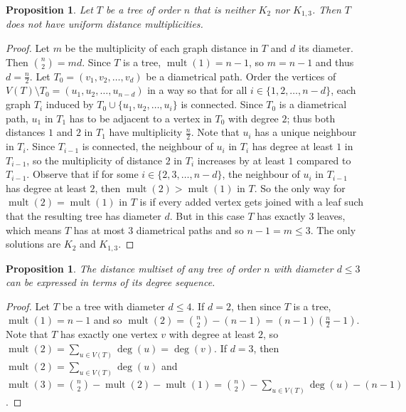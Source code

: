 \documentclass[12]{article}
\DeclareMathOperator{\mult}{mult}
\newtheorem{prop}[thm]{Proposition}
\theoremstyle{definition}
\begin{document}
	\begin{prop}
		Let $T$ be a tree of order $n$ that is neither $K_2$ nor $K_{1,3}$.  Then $T$ does not have uniform distance multiplicities.
	\end{prop}

	\begin{proof}
		Let $m$ be the multiplicity of each graph distance in $T$ and $d$ its diameter.  Then ${n \choose 2} = md$.  Since $T$ is a tree, $\mult(1) = n-1$, so $m = n-1$ and thus $d = \tfrac{n}{2}$.  Let $T_0 = (v_1, v_2, \ldots, v_d)$ be a diametrical path.  Order the vertices of $V(T) \setminus T_0 = (u_1, u_2, \ldots, u_{n-d})$ in a way so that for all $i \in \{1, 2, \ldots, n-d\}$, each graph $T_i$ induced by $T_0 \cup \{u_1, u_2, \ldots, u_i\}$ is connected.  Since $T_0$ is a diametrical path, $u_1$ in $T_1$ has to be adjacent to a vertex in $T_{0}$ with degree $2$; thus both distances $1$ and $2$ in $T_1$ have multiplicity $\tfrac{n}{2}$.  Note that $u_i$ has a unique neighbour in $T_i$.  Since $T_{i-1}$ is connected, the neighbour of $u_i$ in $T_i$ has degree at least $1$ in $T_{i-1}$, so the multiplicity of distance $2$ in $T_i$ increases by at least $1$ compared to $T_{i-1}$.  Observe that if for some $i \in \{2, 3, \ldots, n-d\}$, the neighbour of $u_i$ in $T_{i-1}$ has degree at least $2$, then $\mult(2) > \mult(1)$ in $T$.  So the only way for $\mult(2) = \mult(1)$ in $T$ is if every added vertex gets joined with a leaf such that the resulting tree has diameter $d$.  But in this case $T$ has exactly $3$ leaves, which means $T$ has at most $3$ diametrical paths and so $n-1 = m \leq 3$.  The only solutions are $K_2$ and $K_{1,3}$.  \qedhere
	\end{proof}
	
	\begin{prop}
		The distance multiset of any tree of order $n$ with diameter $d \leq 3$ can be expressed in terms of its degree sequence.
	\end{prop}

	\begin{proof}
		Let $T$ be a tree with diameter $d \leq 4$.  If $d = 2$, then since $T$ is a tree, $\mult(1) = n-1$ and so $\mult(2) = {n \choose 2} - (n-1) = (n-1)(\tfrac{n}{2}-1)$.  Note that $T$ has exactly one vertex $v$ with degree at least $2$, so $\mult(2) = \sum_{u \in V(T)}\deg(u) = \deg(v)$.  If $d=3$, then $\mult(2) = \sum_{u \in V(T)}\deg(u)$ and $\mult(3) = {n \choose 2} - \mult(2) - \mult(1) = {n \choose 2} - \sum_{u \in V(T)}\deg(u) - (n-1)$. \qedhere
	\end{proof}
\end{document}

